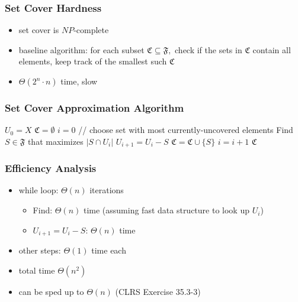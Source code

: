 \documentclass[10pt,aspectratio=169]{beamer}
\begin{document}
\begin{frame} \frametitle{Set Cover Hardness}
  \begin{itemize}
    \item set cover is $NP$-complete
    \item baseline algorithm: for each subset $\mathfrak{C} \subseteq \mathfrak{F},$ check if the sets in $\mathfrak{C}$ contain all elements, keep track of the smallest such $\mathfrak{C}$
    \item $\Theta(2^n \cdot n)$ time, slow
  \end{itemize}
\end{frame}

\begin{frame} \frametitle{Set Cover Approximation Algorithm}
  \begin{algorithmic}[1]
      \State $U_0 = X$ 
      \State $\mathfrak{C} = \emptyset$
      \State $i=0$
        \State // choose set with most currently-uncovered elements
        \State Find $S \in \mathfrak{F}$ that maximizes $|S \cap U_i|$  
        \State $U_{i+1} = U_i - S$
        \State $\mathfrak{C} = \mathfrak{C} \cup \{S\}$
        \State $i = i + 1$
      \EndWhile
      \State \Return $\mathfrak{C}$
    \EndFunction
  \end{algorithmic}
\end{frame}

\begin{frame} \frametitle{Efficiency Analysis}
  \begin{itemize}
    \item while loop: $\Theta(n)$ iterations
    \begin{itemize}
      \item Find: $\Theta(n)$ time (assuming fast data structure to look up $U_i$)
      \item $U_{i+1} = U_i - S$: $\Theta(n)$ time
    \end{itemize}
    \item other steps: $\Theta(1)$ time each
    \item total time $\Theta(n^2)$ 
    \item can be sped up to $\Theta(n)$ (CLRS Exercise 35.3-3)
  \end{itemize}
\end{frame}
\end{document}
